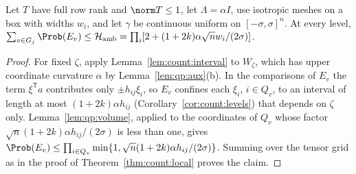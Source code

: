 \begin{lemma}\label{lem:qp:uniform-count}
Let $T$ have full row rank and $\norm T\le1$, let $\Lambda=\alpha I$, use
isotropic meshes on a box with widths $w_i$, and let $\gamma$ be continuous
uniform on $[-\sigma,\sigma]^n$. At every level,
$\sum_{v\in G_j}\Prob(E_v)\le\mathcal H_{\rm amb}=\prod_i[2+(1+2k)\alpha\sqrt nw_i/(2\sigma)]$.
\end{lemma}

\begin{proof}
For fixed $\zeta$, apply Lemma~\ref{lem:count:interval} to $W_\zeta$, which has
upper coordinate curvature $\alpha$ by Lemma~\ref{lem:qp:aux}(b). In the
comparisons of $E_v$ the term $\xi^{\mathsf T} a$ contributes only $\pm h_{ij}\xi_i$, so
$E_v$ confines each $\xi_i$, $i\in Q_v$, to an interval of length at most
$(1+2k)\alpha h_{ij}$ (Corollary~\ref{cor:count:levels}) that depends on
$\zeta$ only. Lemma~\ref{lem:qp:volume}, applied to the coordinates of $Q_v$
whose factor $\sqrt n(1+2k)\alpha h_{ij}/(2\sigma)$ is less than one, gives
$\Prob(E_v)\le\prod_{i\in Q_v}\min\{1,\sqrt n(1+2k)\alpha h_{ij}/(2\sigma)\}$.
Summing over the tensor grid as in the proof of Theorem~\ref{thm:count:local}
proves the claim.
\end{proof}

